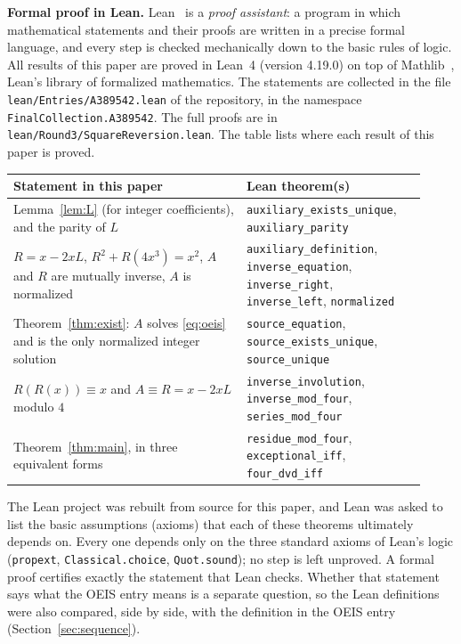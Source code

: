 \documentclass[11pt,a4paper]{article}
\theoremstyle{definition}
\theoremstyle{remark}
\newcommand{\para}[1]{\par\medskip\noindent\textbf{#1}\enspace}
\begin{document}
\para{Formal proof in Lean.}
Lean~\cite{lean} is a \emph{proof assistant}: a program in which mathematical statements and their proofs are written
in a precise formal language, and every step is checked mechanically down to the basic rules of logic. All results of
this paper are proved in Lean~4 (version 4.19.0) on top of Mathlib~\cite{mathlib}, Lean's library of formalized
mathematics. The statements are collected in the file \texttt{lean/Entries/A389542.lean} of the repository,
in the namespace \texttt{FinalCollection.A389542}. The full proofs are in \texttt{lean/Round3/SquareReversion.lean}.
The table lists where each result of this paper is proved.
\begin{center}\small\renewcommand{\arraystretch}{1.25}
\begin{tabular}{>{\raggedright\arraybackslash}p{0.52\linewidth}>{\raggedright\arraybackslash}p{0.4\linewidth}}
\toprule
Statement in this paper & Lean theorem(s)\\
\midrule
Lemma~\ref{lem:L} (for integer coefficients), and the parity of $L$ & \texttt{auxiliary\_\allowbreak{}exists\_\allowbreak{}unique}, \texttt{auxiliary\_\allowbreak{}parity} \\
$R=x-2xL$, $R^2+R(4x^3)=x^2$, $A$ and $R$ are mutually inverse, $A$ is normalized & \texttt{auxiliary\_\allowbreak{}definition}, \texttt{inverse\_\allowbreak{}equation}, \texttt{inverse\_\allowbreak{}right}, \texttt{inverse\_\allowbreak{}left}, \texttt{normalized} \\
Theorem~\ref{thm:exist}: $A$ solves \eqref{eq:oeis} and is the only normalized integer solution & \texttt{source\_\allowbreak{}equation}, \texttt{source\_\allowbreak{}exists\_\allowbreak{}unique}, \texttt{source\_\allowbreak{}unique} \\
$R(R(x))\equiv x$ and $A\equiv R=x-2xL$ modulo $4$ & \texttt{inverse\_\allowbreak{}involution}, \texttt{inverse\_\allowbreak{}mod\_\allowbreak{}four}, \texttt{series\_\allowbreak{}mod\_\allowbreak{}four} \\
Theorem~\ref{thm:main}, in three equivalent forms & \texttt{residue\_\allowbreak{}mod\_\allowbreak{}four}, \texttt{exceptional\_\allowbreak{}iff}, \texttt{four\_\allowbreak{}dvd\_\allowbreak{}iff} \\
\bottomrule
\end{tabular}
\end{center}
The Lean project was rebuilt from source for this paper, and Lean was asked to list the basic assumptions (axioms)
that each of these theorems ultimately depends on. Every one depends only on the three standard axioms of Lean's logic
(\texttt{propext}, \texttt{Classical.choice}, \texttt{Quot.sound}); no step is left unproved. A formal proof certifies
exactly the statement that Lean checks. Whether that statement says what the OEIS entry means is a separate question,
so the Lean definitions were also compared, side by side, with the definition in the OEIS entry
(Section~\ref{sec:sequence}).
\end{document}
